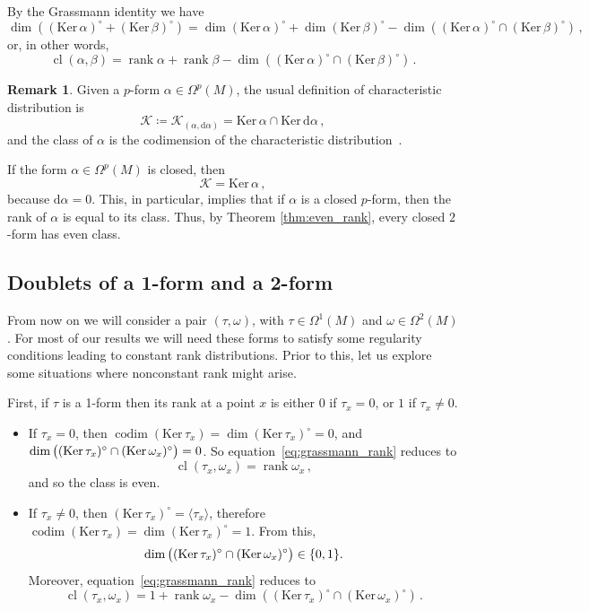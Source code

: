 \documentclass[11pt,twoside]{article}
\theoremstyle{plain}
\theoremstyle{definition}
\newtheorem{remark}[theorem]{Remark}
\renewcommand{\d}{\mathrm{d}}
\DeclareMathOperator{\rk}{rank}
\DeclareMathOperator{\cl}{cl}
\DeclareMathOperator{\codim}{codim}
\def\d{\mathrm{d}}
\def\d{\mathrm{d}}
\def\Ker{\mathrm{Ker \,}}
\def\K{\mathcal{K}}
\begin{document}
By the Grassmann identity we have
$$
\dim ((\Ker \alpha )^{\circ}+(\Ker \beta)^{\circ}) 
=
\dim (\Ker \alpha)^{\circ} +
\dim (\Ker \beta)^{\circ} -
\dim ((\Ker \alpha)^{\circ}\cap(\Ker \beta)^{\circ}) 
\,,
$$
or, in other words,
\begin{equation}
\label{eq:grassmann_rank}
\cl(\alpha,\beta)
=
\rk \alpha +
\rk \beta -
\dim ((\Ker \alpha)^{\circ}\cap(\Ker \beta)^{\circ}) 
\,.
\end{equation}


\begin{remark}
\label{rmrk:class}
Given a $p$-form $\alpha \in \Omega^p(M)$, the usual definition of characteristic distribution is
$$
\K \coloneqq \K_{(\alpha,\d\alpha)} = 
\Ker \alpha \cap \Ker \d \alpha\,,
$$
and the class of $\alpha$ is the codimension of the characteristic distribution~\cite{god_1969,LM_1987}.

If the form $\alpha\in\Omega^p(M)$ is closed, then 
$$
\K= \Ker \alpha\,,
$$
because $\d\alpha = 0$. 
This, in particular, implies that if $\alpha$ is a closed $p$-form, then the rank of $\alpha$ is equal to its class.
Thus, by Theorem \ref{thm:even_rank}, every closed $2$-form has even class.
\end{remark}


\subsection{Doublets of a 1-form and a 2-form}
\label{sec_pairs}

From now on we will consider a pair $(\tau,\omega)$, 
with $\tau \in \Omega^1(M)$ and $\omega \in \Omega^2(M)$. 
For most of our results we will need these forms to satisfy some regularity conditions leading to constant rank distributions. 
Prior to this, let us explore some situations where nonconstant rank might arise.

First, if $\tau$ is a 1-form then 
its rank at a point $x$ is either $0$ if $\tau_x=0$, 
or $1$ if $\tau_x \neq 0$.
\begin{itemize}
\item 
If $\tau_x = 0$, then 
$\codim (\Ker \tau_x) = \dim (\Ker \tau_x)^\circ = 0$, and 
$\dim \left( \strut
(\Ker \tau_x)^{\circ}\cap(\Ker \omega_x)^{\circ}
\right) =0$. 
So equation~\eqref{eq:grassmann_rank} reduces to
\begin{equation}
\label{eq:grassman_even}
\cl(\tau_x,\omega_x) = \rk \omega_x\,,   
\end{equation}
and so the class is even.
\item  
If $\tau_x \neq 0$, then 
$(\Ker \tau_x)^\circ = \langle \tau_x \rangle$, therefore  
$\codim (\Ker \tau_x) = \dim (\Ker \tau_x)^\circ = 1$.
From this,
$$
\dim \left( \strut
(\Ker \tau_x)^{\circ}\cap(\Ker \omega_x)^{\circ}
\right) 
\in \{0,1\}
.
$$
Moreover, equation~\eqref{eq:grassmann_rank} reduces to
\begin{equation}
\label{eq:grassmann_doublets}
\cl(\tau_x,\omega_x)
=
1 +
\rk \omega_x -
\dim ((\Ker \tau_x)^{\circ}\cap(\Ker \omega_x)^{\circ}) 
\,.
\end{equation}
\end{itemize}
\end{document}
